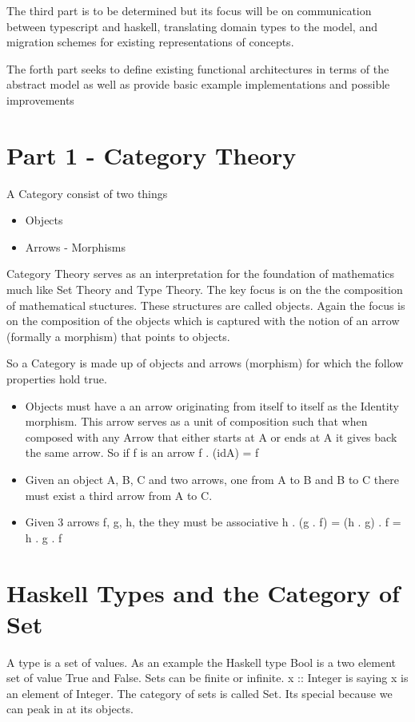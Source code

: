 \documentclass[12pt, letterpaper]{article}
\begin{document}
The third part is to be determined but its focus will be on communication between typescript and haskell, translating domain types to the model, and migration schemes for existing representations of concepts.

The forth part seeks to define existing functional architectures in terms of the abstract model as well as provide basic example implementations and possible improvements

\section{Part 1 - Category Theory}
A Category consist of two things
\begin{itemize}
  \item Objects
  \item Arrows - Morphisms
\end{itemize}


Category Theory serves as an interpretation for the foundation of mathematics much like Set Theory and Type Theory. The key focus is on the the composition of mathematical stuctures. These structures are called objects. Again the focus is on the composition of the objects which is captured with the notion of an arrow (formally a morphism) that points to objects.

So a Category is made up of objects and arrows (morphism) for which the follow properties hold true.

\begin{itemize}
  \item Objects must have a an arrow originating from itself to itself as the Identity morphism. This arrow serves as a unit of composition such that when composed with any Arrow that either starts at A or ends at A it gives back the same arrow. So if f is an arrow f . (idA) = f
  \item Given an object A, B, C and two arrows, one from A to B and B to C there must exist a third arrow from A to C.
  \item Given 3 arrows f, g, h, the they must be associative h . (g . f) = (h . g) . f = h . g . f
\end{itemize}

\section{Haskell Types and the Category of Set}

\begingroup
	A type is a set of values. As an example the Haskell type Bool is a two element set of value True and False.
Sets can be finite or infinite.
x :: Integer is saying x is an element of Integer.
The category of sets is called Set. Its special because we can peak in at its objects.
\endgroup
\end{document}
